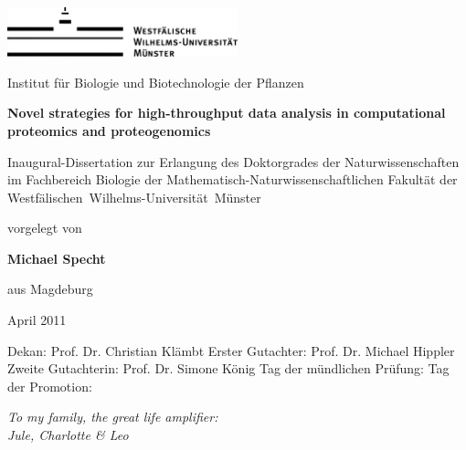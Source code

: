 \documentclass[11pt,a4paper,twoside]{report}
\makeatletter
\def\cleardoublepage{\clearpage\if@twoside \ifodd\c@page\else
    \hbox{}
    \thispagestyle{plain}
    \newpage
    \if@twocolumn\hbox{}\newpage\fi\fi\fi}
\makeatother
\begin{document}
\pagestyle{empty}


\begin{center}
\includegraphics[width=0.5\textwidth]{figures/wwu-logo-black.jpg}

{\Large Institut f\"ur Biologie und Biotechnologie der Pflanzen}

\vspace*{5cm}

{\bf \Huge Novel strategies for high-throughput data analysis in computational proteomics and proteogenomics}

\vspace*{4cm}

{\Large Inaugural-Dissertation zur Erlangung des Doktorgrades der
Naturwissenschaften im Fachbereich Biologie der
Mathematisch-Naturwissenschaftlichen Fakult\"at der
\mbox{Westf\"alischen Wilhelms-Universit\"at M\"unster}}

\vspace*{2cm}

{\Large vorgelegt von}

{\LARGE \bf Michael Specht}

{\Large aus Magdeburg}

{\LARGE April 2011}

\end{center}

\cleardoublepage

\vspace*{550pt}

Dekan: Prof. Dr. Christian Kl\"ambt \newline
Erster Gutachter: Prof. Dr. Michael Hippler \newline
Zweite Gutachterin: Prof. Dr. Simone K\"onig \newline
Tag der m\"undlichen Pr\"ufung: \newline
Tag der Promotion: \newline

\cleardoublepage

\vspace*{200pt}
\begin{flushright}
{\Large\em
To my family, the great life amplifier: \\
Jule, Charlotte \& Leo
}
\end{flushright}
\end{document}
